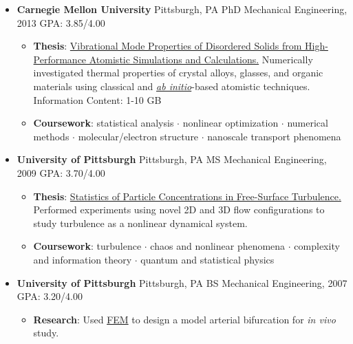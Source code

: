 \documentclass{article}
\newcommand{\area}[2]{\vspace*{-9pt} \begin{verse}\textbf{#1}   #2 \end{verse}  }
\newcommand{\schoolwithcourses}[3]{
 \textbf{#1} #2 $\bullet$ #3\\ 
\vspace*{5pt}
}
\begin{document}
\begin{itemize}[leftmargin=*]
  \item \textbf{Carnegie Mellon University} Pittsburgh, PA PhD Mechanical Engineering, 2013 GPA: 3.85/4.00
  \begin{itemize}
    \item \textbf{Thesis}: \href{http://jasonlarkin.github.io/projects-phd.html}
    {Vibrational Mode Properties of Disordered Solids from High-Performance Atomistic Simulations and Calculations.}
Numerically investigated thermal properties of crystal alloys, glasses, and organic materials using classical and \href{http://en.wikipedia.org/wiki/Ab_initio_quantum_chemistry_methods}{\emph{ab initio}}-based atomistic techniques. Information Content: 1-10 GB
    \item \textbf{Coursework}: statistical analysis $\cdot$ nonlinear optimization $\cdot$ numerical methods $\cdot$ molecular/electron structure $\cdot$ nanoscale transport phenomena  
  \end{itemize}

  \item \textbf{University of Pittsburgh} Pittsburgh, PA MS Mechanical Engineering, 2009 GPA: 3.70/4.00
  \begin{itemize}
    \item \textbf{Thesis}: \href{http://jasonlarkin.github.io/projects-ms.html}{Statistics of Particle Concentrations in Free-Surface Turbulence.} Performed experiments using novel 2D and 3D flow configurations to study turbulence as a nonlinear dynamical system.

    \item \textbf{Coursework}: turbulence $\cdot$ chaos and nonlinear phenomena $\cdot$ complexity and information theory $\cdot$ quantum and statistical physics 
  \end{itemize}

  \item \textbf{University of Pittsburgh} Pittsburgh, PA BS Mechanical Engineering, 2007 GPA: 3.20/4.00
  \begin{itemize}
    \item \textbf{Research}: Used \href{http://en.wikipedia.org/wiki/Finite_element_method}{FEM} to design a model arterial bifurcation for \emph{in vivo} study.
  \end{itemize}


\end{itemize}
\end{document}
